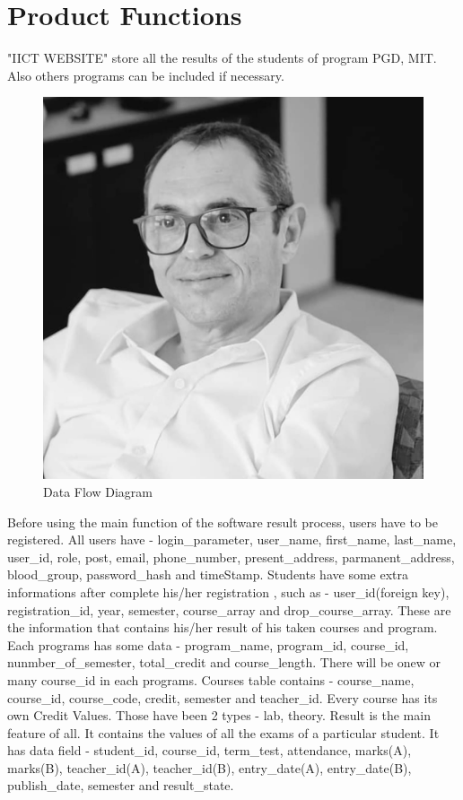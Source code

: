 \documentclass{scrreprt}
\begin{document}
\section{Product Functions}
"IICT WEBSITE" store all the results of the students of program PGD, MIT. Also others programs can be included if necessary.
\begin{figure}[h!]
    \centering
    \includegraphics[width=15cm]{ricardo.jpg}
    \caption{Data Flow Diagram}
    \label{fig:Data Flow Diagram}
\end{figure}
Before using the main function of the software result process, users have to be registered. 
\newline
All users have - login\_parameter, user\_name, first\_name, last\_name, user\_id, role, post, email, phone\_number, present\_address, parmanent\_address, blood\_group, password\_hash and timeStamp.
\newline
Students have some extra informations after complete his/her registration , such as - user\_id(foreign key), registration\_id, year, semester, course\_array and drop\_course\_array. These are the information that contains his/her result of his taken courses and program.
\newline
Each programs has some data - program\_name, program\_id, course\_id, nunmber\_of\_semester, total\_credit and course\_length. There will be onew or many course\_id in each programs.
\newline
Courses table contains - course\_name, course\_id, course\_code, credit, semester and teacher\_id.
\newline
Every course has its own Credit Values. Those have been 2 types - lab, theory.
\newline
Result is the main feature of all. It contains the values of all the exams of a particular student. It has data field - student\_id, course\_id, term\_test, attendance, marks(A), marks(B), teacher\_id(A), teacher\_id(B), entry\_date(A), entry\_date(B), publish\_date, semester	and result\_state.
\end{document}
